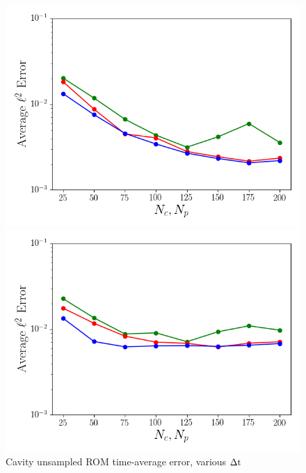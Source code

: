 \begin{figure}
	\begin{minipage}{0.49\linewidth}
		\includegraphics[width=0.99\linewidth]{Chapters/CavityAndCVRC/Images/cavity/unsampled/unsampled_dt5e-6_Average_errorRaw.png}
		\subcaption{$\dt = 5 \times \dtFOM$}
	\end{minipage}
	\begin{minipage}{0.49\linewidth}
		\includegraphics[width=0.99\linewidth]{Chapters/CavityAndCVRC/Images/cavity/unsampled/unsampled_dt1e-5_Average_errorRaw.png}
		\subcaption{$\dt = 10 \times \dtFOM$}
	\end{minipage}
	\caption{\label{fig:cavityUnsampledROMErrVsModes}Cavity unsampled ROM time-average error, various $\Delta \text{t}$}
\end{figure}

